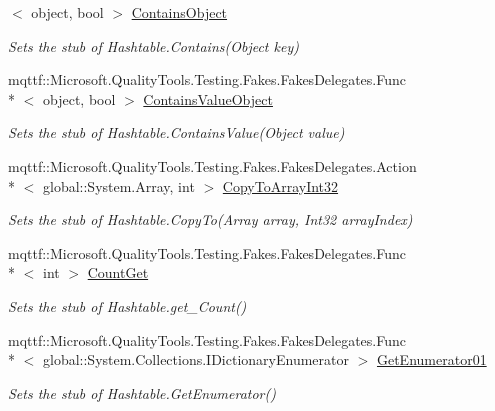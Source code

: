 \begin{DoxyCompactItemize}
$<$ object, bool $>$ \hyperlink{class_system_1_1_configuration_1_1_fakes_1_1_stub_settings_attribute_dictionary_a49cb77856f08ecd586e7362eacdd95a6}{Contains\-Object}
\begin{DoxyCompactList}\small\item\em Sets the stub of Hashtable.\-Contains(\-Object key)\end{DoxyCompactList}\item 
mqttf\-::\-Microsoft.\-Quality\-Tools.\-Testing.\-Fakes.\-Fakes\-Delegates.\-Func\\*
$<$ object, bool $>$ \hyperlink{class_system_1_1_configuration_1_1_fakes_1_1_stub_settings_attribute_dictionary_a92c5889235997c8563e797dad615835c}{Contains\-Value\-Object}
\begin{DoxyCompactList}\small\item\em Sets the stub of Hashtable.\-Contains\-Value(\-Object value)\end{DoxyCompactList}\item 
mqttf\-::\-Microsoft.\-Quality\-Tools.\-Testing.\-Fakes.\-Fakes\-Delegates.\-Action\\*
$<$ global\-::\-System.\-Array, int $>$ \hyperlink{class_system_1_1_configuration_1_1_fakes_1_1_stub_settings_attribute_dictionary_a9f3c69ed4bdb9a39cad6770873e57741}{Copy\-To\-Array\-Int32}
\begin{DoxyCompactList}\small\item\em Sets the stub of Hashtable.\-Copy\-To(\-Array array, Int32 array\-Index)\end{DoxyCompactList}\item 
mqttf\-::\-Microsoft.\-Quality\-Tools.\-Testing.\-Fakes.\-Fakes\-Delegates.\-Func\\*
$<$ int $>$ \hyperlink{class_system_1_1_configuration_1_1_fakes_1_1_stub_settings_attribute_dictionary_ac1f7a6e89a5cbbcd55218c1984785455}{Count\-Get}
\begin{DoxyCompactList}\small\item\em Sets the stub of Hashtable.\-get\-\_\-\-Count()\end{DoxyCompactList}\item 
mqttf\-::\-Microsoft.\-Quality\-Tools.\-Testing.\-Fakes.\-Fakes\-Delegates.\-Func\\*
$<$ global\-::\-System.\-Collections.\-I\-Dictionary\-Enumerator $>$ \hyperlink{class_system_1_1_configuration_1_1_fakes_1_1_stub_settings_attribute_dictionary_aa0739446d9bfcf3cb2e8ae1465c09b3d}{Get\-Enumerator01}
\begin{DoxyCompactList}\small\item\em Sets the stub of Hashtable.\-Get\-Enumerator()\end{DoxyCompactList}\item 

\end{DoxyCompactItemize}
